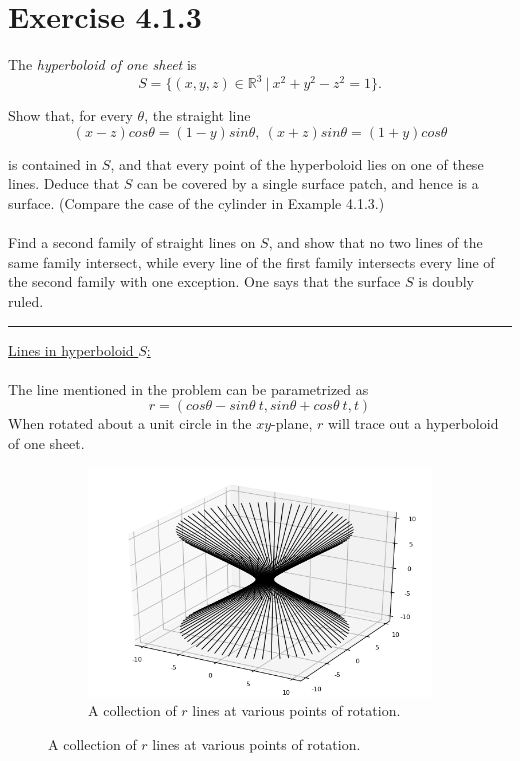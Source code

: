 \documentclass[12pt]{article}
\begin{document}
\maketitle

\section*{Exercise 4.1.3}

The \emph{hyperboloid of one sheet} is
$$
S = \lbrace \left( x,y,z \right) \in \mathbb{R}^3 \ \vert \ x^2 + y^2 - z^2 = 1  \rbrace.
$$

Show that, for every $\theta$, the straight line
$$
(x-z)cos\theta = (1-y)sin\theta,  \ (x+z)sin\theta = (1+y)cos\theta
$$

is contained in $S$, and that every point of the hyperboloid lies on one of these lines. Deduce that $S$ can be covered by a single surface patch, and hence is a surface. (Compare the case of the cylinder in Example 4.1.3.)
\\\\
\indent
Find a second family of straight lines on $S$, and show that no two lines of the same family intersect, while every line of the first family intersects every line of the second family with one exception. One says that the surface $S$ is doubly ruled.

\vspace{1cm}
\hrule
\vspace{1cm}

\noindent
\underline{Lines in hyperboloid $S$:}\\\\
\indent
The line mentioned in the problem can be parametrized as
$$
r = (cos\theta - sin\theta \ t, sin\theta + cos\theta \ t, t)
$$
\clearpage
When rotated about a unit circle in the $xy$-plane, $r$ will trace out a hyperboloid of one sheet.
\begin{figure}[h!]
  \centering
      \begin{subfigure}[b]{0.6\linewidth}
    \includegraphics[width=\linewidth]{./assets/4-1-3/hyperboloid-line-rotation.png}
    \caption*{A collection of $r$ lines at various points of rotation.}
  \end{subfigure}
  \end{figure}
  
\end{document}
